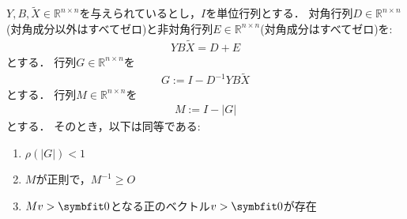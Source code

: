 \begin{Thm}\label{thm:fiedler2}
	$Y,  B,  \tilde{X} \in {\mathbb R}^{n\times n}$を与えられているとし，$I$を単位行列とする．
	対角行列$D \in {\mathbb R}^{n \times n} $(対角成分以外はすべてゼロ)と非対角行列$E \in {\mathbb R}^{n \times n}$(対角成分はすべてゼロ)を:
	\begin{align*}
		Y B \tilde{X} = D + E
	\end{align*}	
	とする．
	行列$G \in {\mathbb R}^{n\times n}$を
	\begin{align*}
		G := I - D^{-1} Y B \tilde{X}
	\end{align*}
	とする．
	行列$M \in {\mathbb R}^{n\times n}$を
	\begin{align*}
		M := I - |G|
	\end{align*}
	とする．
	そのとき，以下は同等である:
	\begin{enumerate}
		\item $\rho( | G | ) < 1$
		\item $M$が正則で，$M^{-1} \ge O$
		\item $M v > \vector{0}$となる正のベクトル$v > \vector{0}$が存在
	\end{enumerate}
\end{Thm}

